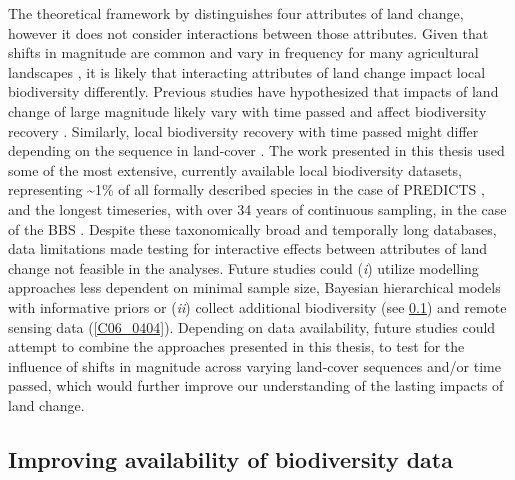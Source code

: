 The theoretical framework by \cite{Watson2014} distinguishes four attributes of land change, however it does not consider interactions between those attributes. Given that shifts in magnitude are common and vary in frequency for many agricultural landscapes \citep{Kleyer2007}, it is likely that interacting attributes of land change impact local biodiversity differently. Previous studies have hypothesized that impacts of land change of large magnitude likely vary with time passed and affect biodiversity recovery \citep{Shackelford2017}. Similarly, local biodiversity recovery with time passed might differ depending on the sequence in land-cover \citep{Chazdon2003,Martin2013}. The work presented in this thesis used some of the most extensive, currently available local biodiversity datasets, representing \textasciitilde 1\% of all formally described species in the case of PREDICTS \citep{Hudson2016}, and the longest timeseries, with over 34 years of continuous sampling, in the case of the BBS \citep[, Figure \ref{F01_01}]{Pardieck2018}. Despite these taxonomically broad and temporally long databases, data limitations made testing for interactive effects between attributes of land change not feasible in the analyses. Future studies could (\textit{i}) utilize modelling approaches less dependent on minimal sample size, \eg Bayesian hierarchical models with informative priors \citep{Iknayan2014} or (\textit{ii}) collect additional biodiversity (see \ref{C06_0403}) and remote sensing data (\ref{C06_0404}). Depending on data availability, future studies could attempt to combine the approaches presented in this thesis, \ie to test for the influence of shifts in magnitude across varying land-cover sequences and/or time passed, which would further improve our understanding of the lasting impacts of land change.

\subsection{Improving availability of biodiversity data}
\label{C06_0403}

